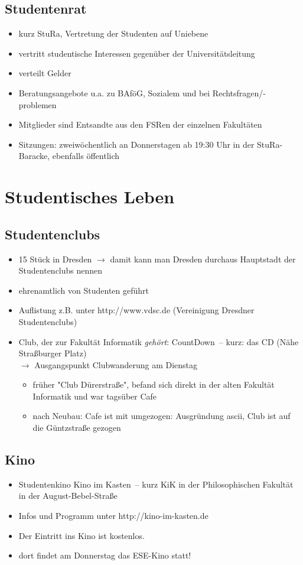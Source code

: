 \documentclass[a4paper,12pt]{report}
\begin{document}
\subsection{Studentenrat}
\begin{itemize}
	\item kurz StuRa, Vertretung der Studenten auf Uniebene
	\item vertritt studentische Interessen gegenüber der Universitätsleitung
	\item verteilt Gelder
	\item Beratungsangebote u.a. zu BAföG, Sozialem und bei Rechtsfragen/-problemen
	\item Mitglieder sind Entsandte aus den FSRen der einzelnen Fakultäten
	\item Sitzungen: zweiwöchentlich an Donnerstagen ab 19:30 Uhr in der StuRa-Baracke, ebenfalls öffentlich
\end{itemize}

\section{Studentisches Leben}

\subsection{Studentenclubs}
\begin{itemize}
	\item 15 Stück in Dresden $\rightarrow$ damit kann man Dresden durchaus Hauptstadt der Studentenclubs nennen
	\item ehrenamtlich von Studenten geführt
	\item  Auflistung z.B. unter http://www.vdsc.de (Vereinigung Dresdner Studentenclubs)
	\item Club, der zur Fakultät Informatik \textit{gehört}: \glqq CountDown\grqq\ -- kurz: das CD (Nähe Straßburger Platz)\\
	$\rightarrow$ Ausgangspunkt Clubwanderung am Dienstag
	\begin{itemize}
		\item früher "Club Dürerstraße", befand sich direkt in der alten Fakultät Informatik und war tagsüber Cafe
		\item nach Neubau: Cafe ist mit umgezogen: Ausgründung ascii, Club ist auf die Güntzstraße gezogen
	\end{itemize}
\end{itemize}

\subsection{Kino}
\begin{itemize}
	\item Studentenkino \glqq Kino im Kasten\grqq\ -- kurz KiK in der Philosophischen Fakultät in der August-Bebel-Straße
	\item Infos und Programm unter http://kino-im-kasten.de
	\item Der Eintritt ins Kino ist kostenlos.
	\item dort findet am Donnerstag das ESE-Kino statt!
\end{itemize}
\end{document}
